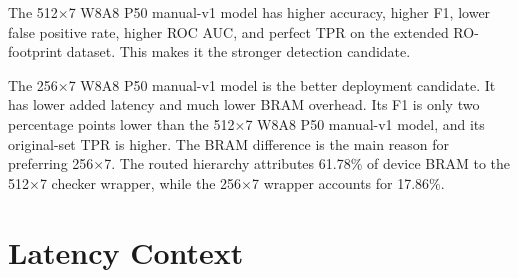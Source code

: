 \begin{table}[t]
    \centering
    \caption{Final synthesized candidates. Resource percentages are routed hls4ml wrapper/user-logic attribution on the target U55C.}
    \label{tab:final-candidates}
\end{table}

The 512$\times$7 W8A8 P50 manual-v1 model has higher accuracy, higher F1, lower false positive rate, higher ROC AUC, and perfect TPR on the extended RO-footprint dataset. This makes it the stronger detection candidate.

The 256$\times$7 W8A8 P50 manual-v1 model is the better deployment candidate. It has lower added latency and much lower BRAM overhead. Its F1 is only two percentage points lower than the 512$\times$7 W8A8 P50 manual-v1 model, and its original-set TPR is higher. The BRAM difference is the main reason for preferring 256$\times$7. The routed hierarchy attributes 61.78\% of device BRAM to the 512$\times$7 checker wrapper, while the 256$\times$7 wrapper accounts for 17.86\%.

\section{Latency Context}
\label{sec:latency-context}

